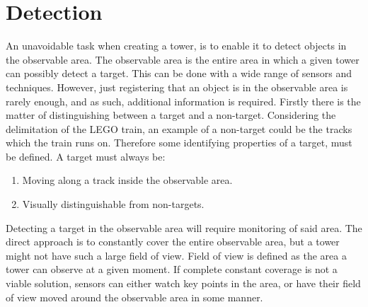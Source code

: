 \section{Detection}\label{sec:registering}
An unavoidable task when creating a tower, is to enable it to detect objects in the observable area. The observable area is the entire area in which a given tower can possibly detect a target. This can be done with a wide range of sensors and techniques. However, just registering that an object is in the observable area is rarely enough, and as such, additional information is required. Firstly there is the matter of distinguishing between a target and a non-target. Considering the delimitation of the LEGO train, an example of a non-target could be the tracks which the train runs on. Therefore some identifying properties of a target, must be defined. A target must always be:

\begin{enumerate}
\item Moving along a track inside the observable area.
\item Visually distinguishable from non-targets. 
\end{enumerate}

Detecting a target in the observable area will require monitoring of said area. The direct approach is to constantly cover the entire observable area, but a tower might not have such a large field of view. Field of view is defined as the area a tower can observe at a given moment. If complete constant coverage is not a viable solution, sensors can either watch key points in the area, or have their field of view moved around the observable area in some manner.\label{observableArea}

